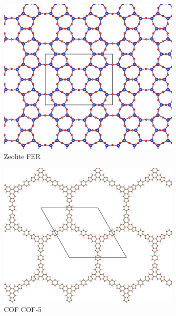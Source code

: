 \documentclass[main.tex]{subfiles}
\begin{document}
\begin{figure}[ht]
  \centering
  \begin{subfigure}[b]{0.32\textwidth}
    \centering
    \includegraphics[height=0.7\textwidth]{figures/1-screening/FER.jpg}
    \caption{Zeolite FER~\cite{FER}}
  \end{subfigure}
  \hfill
  \begin{subfigure}[b]{0.32\textwidth}
    \centering
    \includegraphics[height=0.7\textwidth]{figures/1-screening/COF-5.jpg}
    \caption{COF COF-5~\cite{Cote_2005}}
  \end{subfigure}
  \hfill
  \begin{subfigure}[b]{0.32\textwidth}
    \centering

\end{subfigure}
\end{figure}
\end{document}
